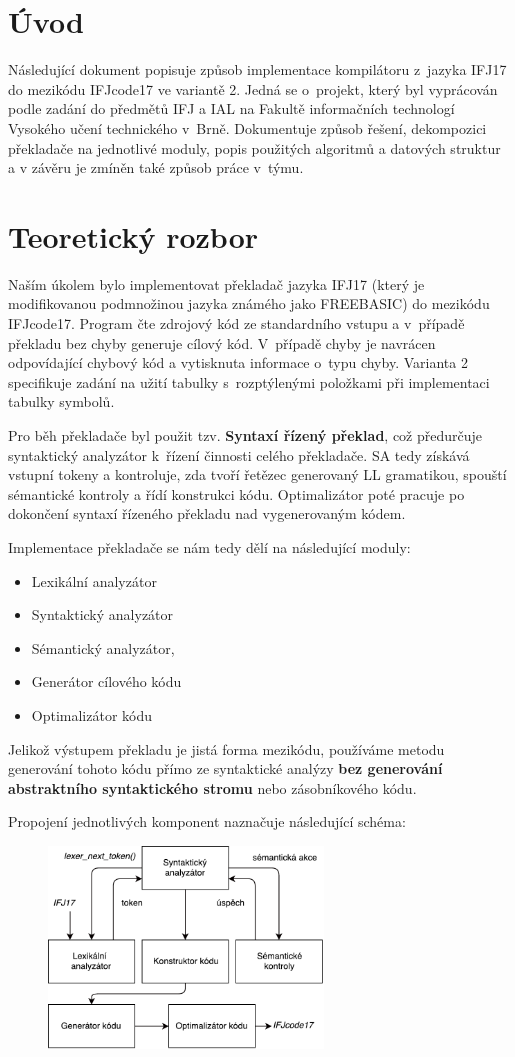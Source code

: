 \section{Úvod}
Následující dokument popisuje způsob implementace kompilátoru z~jazyka IFJ17 do mezikódu
IFJcode17 ve variantě 2. Jedná se o~projekt, který byl vyprácován podle zadání do předmětů IFJ a IAL na Fakultě
informačních technologí Vysokého učení technického v~Brně. Dokumentuje způsob řešení, dekompozici překladače na jednotlivé moduly, popis použitých algoritmů a datových struktur a  v závěru je zmíněn také způsob práce v~týmu.

\section{Teoretický rozbor}
Naším úkolem bylo implementovat překladač jazyka IFJ17 (který je modifikovanou podmnožinou jazyka známého jako \mbox{FREEBASIC})
do mezikódu IFJcode17. Program čte zdrojový kód ze standardního vstupu a v~případě překladu bez chyby generuje cílový
kód. V~případě chyby je navrácen odpovídající chybový kód a vytisknuta informace o~typu chyby. Varianta 2 specifikuje
zadání na užití tabulky s~rozptýlenými položkami při implementaci tabulky symbolů.

Pro běh překladače byl použit tzv. \textbf{Syntaxí řízený překlad}, což předurčuje syntaktický analyzátor k~řízení činnosti
celého překladače. SA tedy získává vstupní tokeny a kontroluje, zda tvoří řetězec generovaný
LL gramatikou, spouští sémantické kontroly a řídí konstrukci kódu.
Optimalizátor poté pracuje po dokončení syntaxí řízeného překladu nad vygenerovaným kódem.

Implementace překladače se nám tedy dělí na následující moduly:
\begin{itemize}
    \item Lexikální analyzátor
    \item Syntaktický analyzátor
    \item Sémantický analyzátor,
    \item Generátor cílového kódu
    \item Optimalizátor kódu
\end{itemize}

Jelikož výstupem překladu je jistá forma mezikódu, používáme metodu generování tohoto kódu přímo ze syntaktické analýzy \textbf{bez generování abstraktního syntaktického stromu} nebo zásobníkového kódu.

Propojení jednotlivých komponent naznačuje následující schéma:
\vspace*{4px}
\begin{figure}[htbp]
	\centering
	\includegraphics[width=0.65\textwidth, angle=0]{src/assets/structure.pdf}
\end{figure}